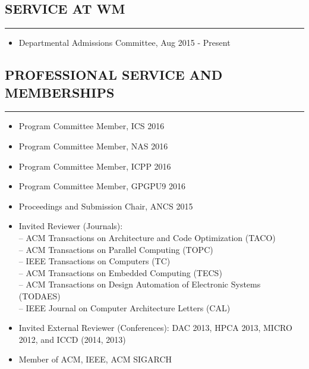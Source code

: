 \documentclass[10pt,a4]{article}
\begin{document}
\subsection*{SERVICE AT WM}
\hrule
\vspace{0.2cm}
\begin{itemize}
	\item Departmental Admissions Committee, Aug 2015 - Present
\end{itemize}

\subsection*{PROFESSIONAL SERVICE AND MEMBERSHIPS}
\hrule
\vspace{0.2cm}
\begin{itemize}
	\item Program Committee Member, ICS 2016
	\item Program Committee Member, NAS 2016
	\item Program Committee Member, ICPP 2016
	\item Program Committee Member, GPGPU9 2016
	\item Proceedings and Submission Chair, ANCS 2015
	\item Invited Reviewer (Journals):  \\
	-- ACM Transactions on Architecture and Code Optimization (TACO) \\
	-- ACM Transactions on Parallel Computing (TOPC) \\
	-- IEEE Transactions on Computers (TC) \\ 
	-- ACM Transactions on Embedded Computing (TECS) \\
	-- ACM Transactions on Design Automation of Electronic Systems (TODAES) \\
	-- IEEE Journal on Computer Architecture Letters (CAL)
	\item Invited External Reviewer (Conferences):
	DAC 2013, HPCA 2013, MICRO 2012, and ICCD (2014, 2013)
	\item Member of ACM, IEEE, ACM SIGARCH
\end{itemize}
\end{document}
